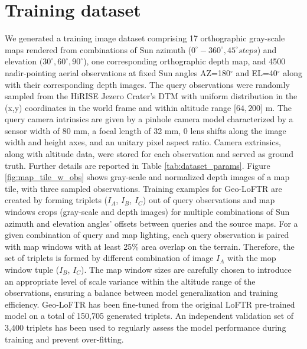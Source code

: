 \section{Training dataset}
\label{sec:training_set}

We generated a training image dataset comprising 17 orthographic gray-scale maps rendered from combinations of Sun azimuth ($0^{\circ}-360^{\circ}, 45^{\circ} steps$) and elevation $(30^{\circ}, 60^{\circ}, 90^{\circ}$), one corresponding orthographic depth map, and 4500 nadir-pointing aerial observations at fixed Sun angles AZ=180$^{\circ}$ and EL=40$^{\circ}$ along with their corresponding depth images. The query observations were randomly sampled from the HiRISE Jezero Crater's DTM with uniform distribution in the (x,y) coordinates in the world frame and within altitude range [$64, 200$] m. The query camera intrinsics are given by a pinhole camera model characterized by a sensor width of 80 mm, a focal length of 32 mm, 0 lens shifts along the image width and height axes, and an unitary pixel aspect ratio. Camera extrinsics, along with altitude data, were stored for each observation and served as ground truth. Further details are reported in Table \ref{tab:dataset_params}. Figure \ref{fig:map_tile_w_obs} shows gray-scale and normalized depth images of a map tile, with three sampled observations. 
Training examples for Geo-LoFTR are created by forming triplets ($I_A$, $I_B$, $I_C$) out of query observations and map windows crops (gray-scale and depth images) for multiple combinations of Sun azimuth and elevation angles' offsets between queries and the source maps. For a given combination of query and map lighting, each query observation is paired with map windows with at least 25\% area overlap on the terrain. Therefore, the set of triplets is formed by different combination of image $I_A$ with the mop window tuple ($I_B$, $I_C$). The map window sizes are carefully chosen to introduce an appropriate level of scale variance within the altitude range of the observations, ensuring a balance between model generalization and training efficiency. 
Geo-LoFTR has been fine-tuned from the original LoFTR pre-trained model on a total 
of 150,705 generated triplets. An independent validation set of 3,400 triplets has been used to regularly assess the model performance during training and prevent over-fitting. 

